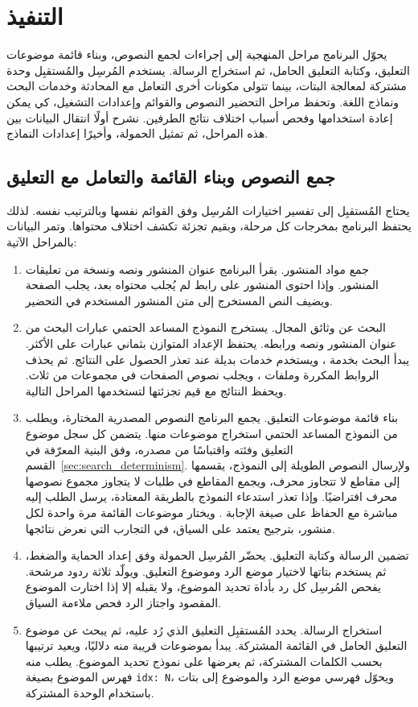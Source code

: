 \section{التنفيذ}
\label{sec:implementation}

يحوّل البرنامج مراحل المنهجية إلى إجراءات لجمع النصوص، وبناء قائمة موضوعات التعليق، وكتابة التعليق الحامل، ثم استخراج الرسالة.
يستخدم المُرسِل والمُستقبِل وحدة مشتركة لمعالجة البتات، بينما تتولى مكونات أخرى التعامل مع المحادثة وخدمات البحث ونماذج اللغة.
وتحفظ مراحل التحضير النصوص والقوائم وإعدادات التشغيل، كي يمكن إعادة استخدامها وفحص أسباب اختلاف نتائج الطرفين.
نشرح أولًا انتقال البيانات بين هذه المراحل، ثم تمثيل الحمولة، وأخيرًا إعدادات النماذج.

\subsection{جمع النصوص وبناء القائمة والتعامل مع التعليق}
يحتاج المُستقبِل إلى تفسير اختيارات المُرسِل وفق القوائم نفسها وبالترتيب نفسه. لذلك يحتفظ البرنامج بمخرجات كل مرحلة، وبقيم تجزئة تكشف اختلاف محتواها.
وتمر البيانات بالمراحل الآتية:
\begin{enumerate}
\item جمع مواد المنشور. يقرأ البرنامج عنوان المنشور ونصه ونسخة من تعليقات المنشور. وإذا احتوى المنشور على رابط لم يُجلب محتواه بعد، يجلب الصفحة ويضيف النص المستخرج إلى متن المنشور المستخدم في التحضير.
\item البحث عن وثائق المجال. يستخرج النموذج المساعد الحتمي عبارات البحث من عنوان المنشور ونصه ورابطه. يحتفظ الإعداد المتوازن بثماني عبارات على الأكثر. يبدأ البحث بخدمة ، ويستخدم خدمات بديلة عند تعذر الحصول على النتائج. ثم يحذف الروابط المكررة وملفات ، ويجلب نصوص الصفحات في مجموعات من ثلاث. ويحفظ النتائج مع قيم تجزئتها لتستخدمها المراحل التالية.
\item بناء قائمة موضوعات التعليق. يجمع البرنامج النصوص المصدرية المختارة، ويطلب من النموذج المساعد الحتمي استخراج موضوعات منها. يتضمن كل سجل موضوع التعليق وفئته واقتباسًا من مصدره، وفق البنية المعرّفة في القسم~\ref{sec:search_determinism}. ولإرسال النصوص الطويلة إلى النموذج، يقسمها إلى مقاطع لا تتجاوز  محرف، ويجمع المقاطع في طلبات لا يتجاوز مجموع نصوصها  محرف افتراضيًا. وإذا تعذر استدعاء النموذج بالطريقة المعتادة، يرسل الطلب إليه مباشرة مع الحفاظ على صيغة الإجابة . ويختار موضوعات القائمة مرة واحدة لكل منشور، بترجيح يعتمد على السياق، في التجارب التي نعرض نتائجها.
\item تضمين الرسالة وكتابة التعليق. يحضّر المُرسِل الحمولة وفق إعداد الحماية والضغط، ثم يستخدم بتاتها لاختيار موضع الرد وموضوع التعليق. ويولّد ثلاثة ردود مرشحة. يفحص المُرسِل كل رد بأداة تحديد الموضوع، ولا يقبله إلا إذا اختارت الموضوع المقصود واجتاز الرد فحص ملاءمة السياق.
\item استخراج الرسالة. يحدد المُستقبِل التعليق الذي رُد عليه، ثم يبحث عن موضوع التعليق الحامل في القائمة المشتركة. يبدأ بموضوعات قريبة منه دلاليًا، ويعيد ترتيبها بحسب الكلمات المشتركة، ثم يعرضها على نموذج تحديد الموضوع. يطلب منه فهرس الموضوع بصيغة \texttt{idx: N}، ويحوّل فهرسي موضع الرد والموضوع إلى بتات باستخدام الوحدة المشتركة.
\end{enumerate}

